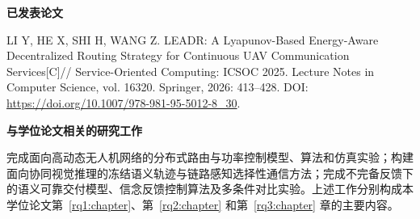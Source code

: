 
\noindent\textbf{已发表论文}

\begin{enumerate}[label={[\arabic*]},leftmargin=2em]
\item LI Y, HE X, SHI H, WANG Z. LEADR: A Lyapunov-Based Energy-Aware Decentralized Routing Strategy for Continuous UAV Communication Services[C]// Service-Oriented Computing: ICSOC 2025. Lecture Notes in Computer Science, vol. 16320. Springer, 2026: 413--428. DOI: \url{https://doi.org/10.1007/978-981-95-5012-8_30}.
\end{enumerate}

\noindent\textbf{与学位论文相关的研究工作}

完成面向高动态无人机网络的分布式路由与功率控制模型、算法和仿真实验；构建面向协同视觉推理的冻结语义轨迹与链路感知选择性通信方法；完成不完备反馈下的语义可靠交付模型、信念反馈控制算法及多条件对比实验。上述工作分别构成本学位论文第~\ref{rq1:chapter}、第~\ref{rq2:chapter} 和第~\ref{rq3:chapter} 章的主要内容。

